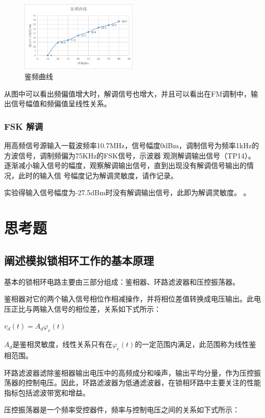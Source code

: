\documentclass{../source/Experiment}
\begin{document}
\begin{figure}[H]
    \centering
    \includegraphics[width = 0.5\textwidth]{lab4/图片1.png}
    \caption{鉴频曲线}
\end{figure}

从图中可以看出频偏值增大时，解调信号也增大，并且可以看出在FM调制中，输出信号幅值和频偏值呈线性关系。
\subsubsection{FSK 解调}

用高频信号源输入一载波频率10.7MHz，信号幅度0dBm，调制信号为频率1kHz的方波信号，调制频偏为75KHz的FSK信号，示波器
观测解调输出信号（TP14）。逐渐减小输入信号的幅度，观察解调输出信号，直到出现没有解调信号输出的情况，此时的输入信
号幅度记为解调灵敏度，请作记录。

实验得输入信号幅度为-27.5dBm时没有解调输出信号，此即为解调灵敏度。
。

\section{思考题}
\subsection{阐述模拟锁相环工作的基本原理 }

基本的锁相环电路主要由三部分组成：鉴相器、环路滤波器和压控振荡器。

鉴相器对它的两个输入信号相位作相减操作，并将相位差值转换成电压输出。此电压正比与两输入信号的相位差，关系如下式所示：

$v_d(t) = A_d\varphi_e (t)$

$A_d$是鉴相灵敏度，线性关系只有在$\varphi_e(t)$的一定范围内满足，此范围称为线性鉴相范围。

环路滤波器滤除鉴相器输出电压中的高频成分和噪声，输出平均分量，作为压控振荡器的控制电压。因此，环路滤波器为低通滤波器，在锁相环路中主要关注的性能指标包括滤波带宽和增益。

压控振荡器是一个频率受控器件，频率与控制电压之间的关系如下式所示：
\end{document}
